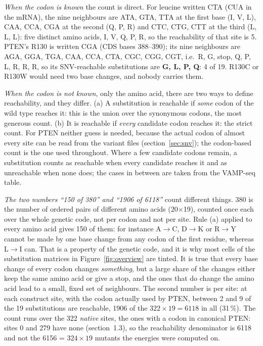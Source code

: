 \documentclass[11pt,a4paper]{article}
\begin{document}
\emph{When the codon is known} the count is direct. For leucine written CTA
(CUA in the mRNA), the nine neighbours are ATA, GTA, TTA at the first base
(I, V, L), CAA, CCA, CGA at the second (Q, P, R) and CTC, CTG, CTT at the third
(L, L, L): five distinct amino acids, I, V, Q, P, R, so the reachability of
that site is 5. PTEN's R130 is written CGA (CDS bases 388--390); its nine
neighbours are AGA, GGA, TGA, CAA, CCA, CTA, CGC, CGG, CGT, i.e.\ R, G, stop,
Q, P, L, R, R, R, so its SNV-reachable substitutions are \textbf{G, L, P, Q}:
4 of 19. R130C or R130W would need two base changes, and nobody carries them.

\emph{When the codon is not known}, only the amino acid, there are two ways
to define reachability, and they differ. (a) A substitution is reachable if
\emph{some} codon of the wild type reaches it: this is the union over the
synonymous codons, the most generous count. (b) It is reachable if \emph{every}
candidate codon reaches it: the strict count. For PTEN neither guess is needed,
because the actual codon of almost every site can be read from the variant
files (section~\ref{sec:snv}); the codon-based count is the one used
throughout. Where a few candidate codons remain, a substitution counts as
reachable when every candidate reaches it and as unreachable when none does;
the cases in between are taken from the VAMP-seq table.

\emph{The two numbers ``150 of 380'' and ``1906 of 6118''} count different
things. 380 is the number of ordered pairs of different amino acids
(20$\times$19), counted once each over the whole genetic code, not per codon
and not per site. Rule (a) applied to every amino acid gives 150 of them: for
instance A$\to$C, D$\to$K or R$\to$Y cannot be made by one base change from any
codon of the first residue, whereas L$\to$I can. That is a property of the
genetic code, and it is why most cells of the substitution matrices in
Figure~\ref{fig:overview} are tinted. It is true that every base change of
every codon changes \emph{something}, but a large share of the changes either
keep the same amino acid or give a stop, and the ones that do change the amino
acid lead to a small, fixed set of neighbours. The second number is per site:
at each construct site, with the codon actually used by PTEN, between 2 and 9
of the 19 substitutions are reachable, 1906 of the $322\times19 = 6118$ in
all (31\,\%). The count runs over the 322 \emph{native} sites, the ones with a
codon in canonical PTEN: sites 0 and 279 have none (section~1.3), so the
reachability denominator is 6118 and not the 6156 = $324\times19$ mutants the
energies were computed on.
\end{document}
